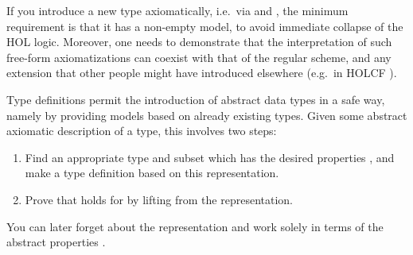 \begin{isabellebody}
\begin{isamarkuptext}
  \begin{warn}
  If you introduce a new type axiomatically, i.e.\ via \hyperlink{command.typedecl}{\mbox{}} and \hyperlink{command.axiomatization}{\mbox{}}, the minimum requirement
  is that it has a non-empty model, to avoid immediate collapse of the
  HOL logic.  Moreover, one needs to demonstrate that the
  interpretation of such free-form axiomatizations can coexist with
  that of the regular \hypertarget{command.typedef}{\hyperlink{command.typedef}{\mbox{}}} scheme, and any extension
  that other people might have introduced elsewhere (e.g.\ in HOLCF
  \cite{MuellerNvOS99}).
  \end{warn}%
\end{isamarkuptext}%
\isamarkuptrue%
%
\isamarkuptrue%
%
\begin{isamarkuptext}%
Type definitions permit the introduction of abstract data
  types in a safe way, namely by providing models based on already
  existing types.  Given some abstract axiomatic description 
  of a type, this involves two steps:

  \begin{enumerate}

  \item Find an appropriate type  and subset  which
  has the desired properties , and make a type definition
  based on this representation.

  \item Prove that  holds for  by lifting 
  from the representation.

  \end{enumerate}

  You can later forget about the representation and work solely in
  terms of the abstract properties .


\end{isamarkuptext}
\end{isabellebody}
